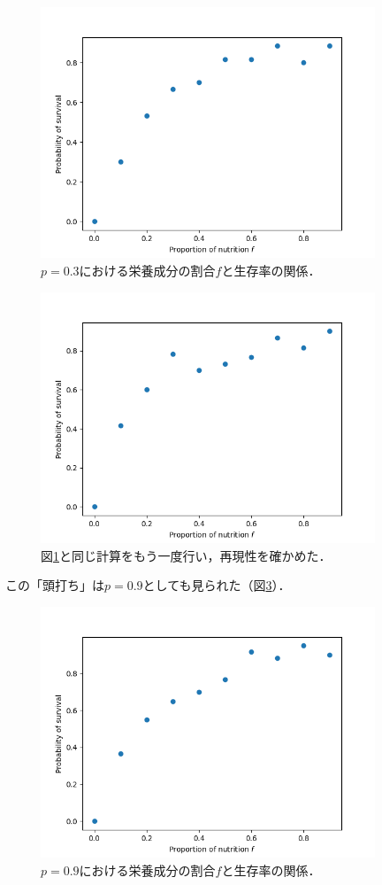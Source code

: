 \documentclass[a4paper,11pt]{jsarticle}
\begin{document}
\begin{figure}[htbp]
  \centering
  \includegraphics[width=10cm]{psf60_1.png}
  \caption{$p=0.3$における栄養成分の割合$f$と生存率の関係．}
  \label{fig:psf60_1}
\end{figure}

\begin{figure}[htbp]
  \centering
  \includegraphics[width=10cm]{psf60_2.png}
  \caption{図\ref{fig:psf60_1}と同じ計算をもう一度行い，再現性を確かめた．}
  \label{fig:psf60_2}
\end{figure}

この「頭打ち」は$p=0.9$としても見られた（図\ref{fig:psf60_3_09}）．

\begin{figure}[htbp]
  \centering
  \includegraphics[width=10cm]{psf60_3_09.png}
  \caption{$p=0.9$における栄養成分の割合$f$と生存率の関係．}
  \label{fig:psf60_3_09}
\end{figure}
\end{document}
